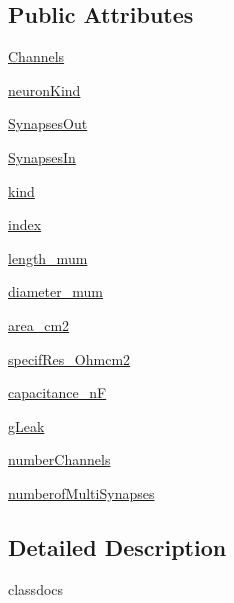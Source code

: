 \subsection*{Public Attributes}
\begin{DoxyCompactItemize}
\item 
\hyperlink{class_compartment_1_1_compartment_aa444563be9598d7cc54fd8d10ea6a04f}{Channels}
\item 
\hyperlink{class_compartment_1_1_compartment_ad42f32769afd94d1e7d7d54008efb6fa}{neuron\-Kind}
\item 
\hyperlink{class_compartment_1_1_compartment_a85d64ebf548276c873501d2dc3489ceb}{Synapses\-Out}
\item 
\hyperlink{class_compartment_1_1_compartment_abe41aff3bffed80f4b848bd14763d506}{Synapses\-In}
\item 
\hyperlink{class_compartment_1_1_compartment_a74f2266a2231c4a81cc680bc201f0ffd}{kind}
\item 
\hyperlink{class_compartment_1_1_compartment_a9402ef46ede52521ebbb9e9d2d68d631}{index}
\item 
\hyperlink{class_compartment_1_1_compartment_a8154742b0082eea301690e3566e477b6}{length\-\_\-mum}
\item 
\hyperlink{class_compartment_1_1_compartment_aacb7db7022f5d3534d17642d47281cbb}{diameter\-\_\-mum}
\item 
\hyperlink{class_compartment_1_1_compartment_a5d841c1a80dbaaf257dfc0a9cb763abc}{area\-\_\-cm2}
\item 
\hyperlink{class_compartment_1_1_compartment_aed6025b5335c2ce41d37c02fd3c1c042}{specif\-Res\-\_\-\-Ohmcm2}
\item 
\hyperlink{class_compartment_1_1_compartment_ac7d7462a45d4d623ed688c187c9184aa}{capacitance\-\_\-n\-F}
\item 
\hyperlink{class_compartment_1_1_compartment_a10d50da6a622982a6483c7cd78482bde}{g\-Leak}
\item 
\hyperlink{class_compartment_1_1_compartment_a0fa96147f76e7814f30610027ed425df}{number\-Channels}
\item 
\hyperlink{class_compartment_1_1_compartment_aed4deea8b0fc160f16ecb1ef39cacba4}{numberof\-Multi\-Synapses}
\end{DoxyCompactItemize}


\subsection{Detailed Description}
classdocs 

